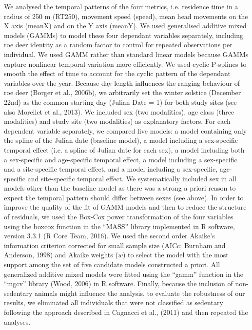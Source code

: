\documentclass[a4paper,11pt]{article}
\begin{document}
We analysed the temporal patterns of the four metrics, i.e. residence
time in a radius of 250 m (RT250), movement speed (speed), mean head
movements on the X axis (meanX) and on the Y axis (meanY). We used
generalised additive mixed models (GAMMs) to model these four
dependant variables separately, including roe deer identity as a
random factor to control for repeated observations per individual. We
used GAMM rather than standard linear models because GAMMs capture
nonlinear temporal variation more efficiently. We used cyclic
P-splines to smooth the effect of time to account for the cyclic
pattern of the dependant variables over the year. Because day length
influences the ranging behaviour of roe deer (Borger et al., 2006b),
we arbitrarily set the winter solstice (December 22nd) as the common
starting day (Julian Date = 1) for both study sites (see also Morellet
et al., 2013). We included sex (two modalities), age class (three
modalities) and study site (two modalities) as explanatory
factors. For each dependent variable separately, we compared five
models: a model containing only the spline of the Julian date
(baseline model), a model including a sex-specific temporal effect
(i.e. a spline of Julian date for each sex), a model including both a
sex-specific and age-specific temporal effect, a model including a
sex-specific and a site-specific temporal effect, and a model
including a sex-specific, age-specific and site-specific temporal
effect. We systematically included sex in all models other than the
baseline model as there was a strong a priori reason to expect the
temporal pattern should differ between sexes (see above). In order to
improve the quality of the fit of GAMM models and then to reduce the
structure of residuals, we used the Box-Cox power transformation of
the four variables using the boxcox function in the “MASS” library
implemented in R software, version 3.3.1 (R Core Team, 2016). We used
the second order Akaike’s information criterion corrected for small
sample size (AICc; Burnham and Anderson, 1998) and Akaike weights ($w$)
to select the model with the most support among the set of five
candidate models constructed a priori. All generalized additive mixed
models were fitted using the “gamm” function in the “mgcv” library
(Wood, 2006) in R software. Finally, because
the inclusion of non-sedentary animals might influence the analysis,
to evaluate the robustness of our results, we eliminated all
individuals that were not classified as sedentary following the
approach described in Cagnacci et al., (2011) and then repeated the
analyses.
\end{document}
